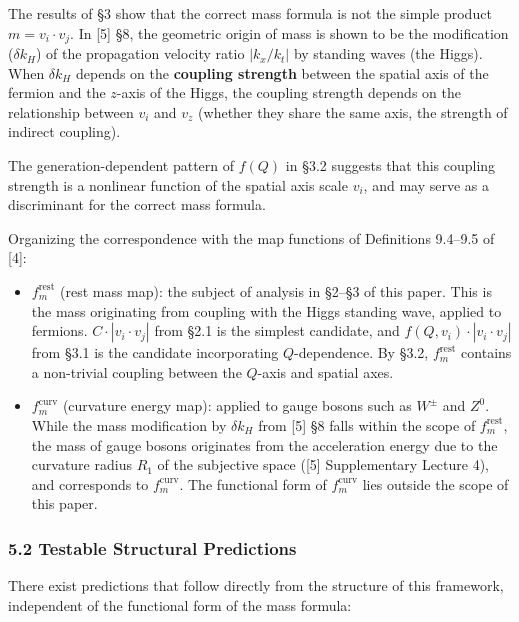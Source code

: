 \documentclass[
  a4paper,11pt]{article}
\providecommand{\tightlist}{%
  \setlength{\itemsep}{0pt}\setlength{\parskip}{0pt}}
\theoremstyle{definition}
\theoremstyle{remark}
\begin{document}
The results of §3 show that the correct mass formula is not the simple
product \(m = v_i \cdot v_j\). In {[}5{]} §8, the geometric origin of
mass is shown to be the modification (\(\delta k_H\)) of the propagation
velocity ratio \(|k_x / k_t|\) by standing waves (the Higgs). When
\(\delta k_H\) depends on the \textbf{coupling strength} between the
spatial axis of the fermion and the \(z\)-axis of the Higgs, the
coupling strength depends on the relationship between \(v_i\) and
\(v_z\) (whether they share the same axis, the strength of indirect
coupling).

The generation-dependent pattern of \(f(Q)\) in §3.2 suggests that this
coupling strength is a nonlinear function of the spatial axis scale
\(v_i\), and may serve as a discriminant for the correct mass formula.

Organizing the correspondence with the map functions of Definitions
9.4--9.5 of {[}4{]}:

\begin{itemize}
\tightlist
\item
  \textbf{\(f_m^{\text{rest}}\)} (rest mass map): the subject of
  analysis in §2--§3 of this paper. This is the mass originating from
  coupling with the Higgs standing wave, applied to fermions.
  \(C \cdot |v_i \cdot v_j|\) from §2.1 is the simplest candidate, and
  \(f(Q, v_i) \cdot |v_i \cdot v_j|\) from §3.1 is the candidate
  incorporating \(Q\)-dependence. By §3.2, \(f_m^{\text{rest}}\)
  contains a non-trivial coupling between the \(Q\)-axis and spatial
  axes.
\item
  \textbf{\(f_m^{\text{curv}}\)} (curvature energy map): applied to
  gauge bosons such as \(W^{\pm}\) and \(Z^0\). While the mass
  modification by \(\delta k_H\) from {[}5{]} §8 falls within the scope
  of \(f_m^{\text{rest}}\), the mass of gauge bosons originates from the
  acceleration energy due to the curvature radius \(R_1\) of the
  subjective space ({[}5{]} Supplementary Lecture 4), and corresponds to
  \(f_m^{\text{curv}}\). The functional form of \(f_m^{\text{curv}}\)
  lies outside the scope of this paper.
\end{itemize}

\subsubsection{5.2 Testable Structural
Predictions}\label{testable-structural-predictions}

There exist predictions that follow directly from the structure of this
framework, independent of the functional form of the mass formula:
\end{document}
